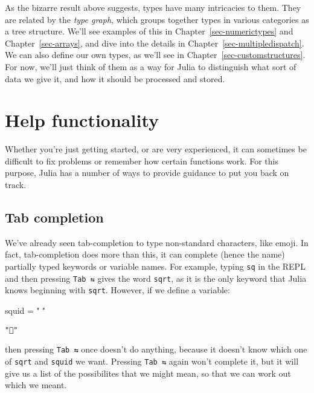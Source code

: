 \documentclass[
  letterpaper,
  DIV=11,
  numbers=noendperiod]{scrreprt}
\newenvironment{Shaded}{\begin{snugshade}}{\end{snugshade}}
\newcommand{\NormalTok}[1]{\textcolor[rgb]{0.00,0.23,0.31}{#1}}
\newcommand{\OperatorTok}[1]{\textcolor[rgb]{0.37,0.37,0.37}{#1}}
\newcommand{\StringTok}[1]{\textcolor[rgb]{0.13,0.47,0.30}{#1}}
\begin{document}
As the bizarre result above suggests, types have many intricacies to
them. They are related by the \emph{type graph}, which groups together
types in various categories as a tree structure. We'll see examples of
this in Chapter~\ref{sec-numerictypes} and Chapter~\ref{sec-arrays}, and
dive into the details in Chapter~\ref{sec-multipledispatch}. We can also
define our own types, as we'll see in
Chapter~\ref{sec-customstructures}. For now, we'll just think of them as
a way for Julia to distinguish what sort of data we give it, and how it
should be processed and stored.

\hypertarget{help-functionality}{%
\section{Help functionality}\label{help-functionality}}

Whether you're just getting started, or are very experienced, it can
sometimes be difficult to fix problems or remember how certain functions
work. For this purpose, Julia has a number of ways to provide guidance
to put you back on track.

\hypertarget{tab-completion}{%
\subsection{Tab completion}\label{tab-completion}}

We've already seen tab-completion to type non-standard characters, like
emoji. In fact, tab-completion does more than this, it can complete
(hence the name) partially typed keywords or variable names. For
example, typing \texttt{sq} in the REPL and then pressing
\texttt{Tab\ ⇆} gives the word \texttt{sqrt}, as it is the only keyword
that Julia knows beginning with \texttt{sqrt}. However, if we define a
variable:

\begin{Shaded}
\begin{Highlighting}[]
\NormalTok{squid }\OperatorTok{=} \StringTok{"🦑"}
\end{Highlighting}
\end{Shaded}

\begin{verbatim}
"🦑"
\end{verbatim}

then pressing \texttt{Tab\ ⇆} once doesn't do anything, because it
doesn't know which one of \texttt{sqrt} and \texttt{squid} we want.
Pressing \texttt{Tab\ ⇆} again won't complete it, but it will give us a
list of the possibilites that we might mean, so that we can work out
which we meant.
\end{document}
